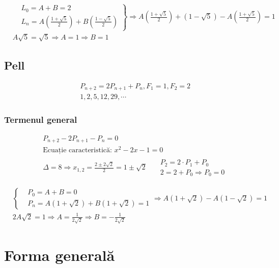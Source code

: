 \documentclass[12pt]{article}
\theoremstyle{definition}
\begin{document}
		\[\begin{aligned}
			&\left.
				\begin{aligned}
					&L_0=A+B=2\\
					&L_n= A\left(\frac{1+\sqrt{5}}{2}\right)
       						+ B\left(\frac{1-\sqrt{5}}{2}\right)
				\end{aligned}
			\right\}
			\Rightarrow
			A\left(\frac{1+\sqrt{5}}{2}\right)+(1-\sqrt{5}) - A\left(\frac{1+\sqrt{5}}{2}\right)=1\\
			&A\sqrt{5}=\sqrt{5} \Rightarrow A=1 \Rightarrow B=1
		\end{aligned}\]
		
		\subsection*{Pell}
		\[\begin{aligned}
			&P_{n+2}=2P_{n+1}+P_n, F_1=1, F_2=2\\
			&1,2,5,12,29,\cdots
		\end{aligned}\]
		\subsubsection*{Termenul general}
		\[\begin{aligned}
			&P_{n+2}-2P_{n+1}-P_n = 0\\
			&\text{Ecuație caracteristică: }x^2-2x-1=0 \\
		&\Delta = 8 \Rightarrow x_{1,2} = \frac{2 \pm 2\sqrt{2}}{2}=1\pm\sqrt{2}
			\ \ \ \begin{aligned}
				&P_2 = 2 \cdot P_1 + P_0\\
				&2 = 2 + P_0 \Rightarrow P_0=0
			\end{aligned}
		\end{aligned}\]

		\[\begin{aligned}
			&\left\{
				\begin{aligned}
					&P_0=A+B=0\\
					&P_n= A(1+\sqrt{2})+B(1+\sqrt{2})=1 
				\end{aligned}
			\right.
			\Rightarrow
			A(1+\sqrt{2})-A(1-\sqrt{2})=1\\
			&2A\sqrt{2}=1 \Rightarrow A=\frac{1}{2\sqrt{2}} \Rightarrow B=-\frac{1}{2\sqrt{2}}
			&
		\end{aligned}\]
		\section*{Forma generală}
\end{document}
